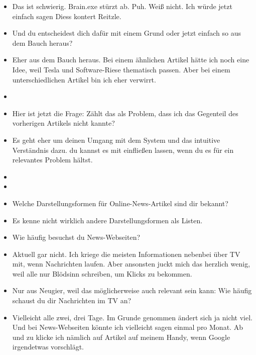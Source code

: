 {\begin{itemize}[]
            \item {} Das ist schwierig.
                  Brain.exe stürzt ab.
                  Puh.
                  Weiß nicht.
                  Ich würde jetzt einfach sagen \flqq Diess kontert Reitzle\frqq{}.
            \item {} Und du entscheidest dich dafür mit einem Grund oder jetzt einfach so aus dem Bauch heraus?
            \item {} Eher aus dem Bauch heraus.
                  Bei einem ähnlichen Artikel hätte ich noch eine Idee, weil Tesla und Software-Riese thematisch passen.
                  Aber bei einem unterschiedlichen Artikel bin ich eher verwirrt.
            \item {}
            \item {} Hier ist jetzt die Frage: Zählt das als Problem, dass ich das Gegenteil des vorherigen Artikels nicht kannte?
            \item {} Es geht eher um deinen Umgang mit dem System und das intuitive Verständnis dazu.
                  du kannst es mit einfließen lassen, wenn du es für ein relevantes Problem hältst.
            \item {}
            \item {}
            \item {} Welche Darstellungsformen für Online-News-Artikel sind dir bekannt?
            \item {} Es kenne nicht wirklich andere Darstellungsformen als Listen.
            \item {} Wie häufig besuchst du News-Webseiten?
            \item {} Aktuell gar nicht.
                  Ich kriege die meisten Informationen nebenbei über TV mit, wenn Nachrichten laufen.
                  Aber ansonsten juckt mich das herzlich wenig, weil alle nur Blödsinn schreiben, um Klicks zu bekommen.
            \item {} Nur aus Neugier, weil das möglicherweise auch relevant sein kann: Wie häufig schaust du dir Nachrichten im TV an?
            \item {} Vielleicht alle zwei, drei Tage. Im Grunde genommen ändert sich ja nicht viel.
                  Und bei News-Webseiten könnte ich vielleicht sagen einmal pro Monat.
                  Ab und zu klicke ich nämlich auf Artikel auf meinem Handy, wenn Google irgendetwas vorschlägt.

\end{itemize}}
